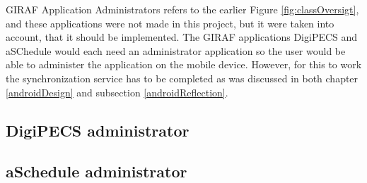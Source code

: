 
 

GIRAF Application Administrators refers to the earlier Figure \vref{fig:classOversigt}, and these applications were not made in this project, but it were taken into account, that it should be implemented. The GIRAF applications DigiPECS and aSChedule would each need an administrator application so the user would be able to administer the application on the mobile device. However, for this to work the synchronization service has to be completed as was discussed in both chapter \vref{androidDesign} and subsection \ref{androidReflection}.
   
\subsection{DigiPECS administrator}


\subsection{aSchedule administrator}


